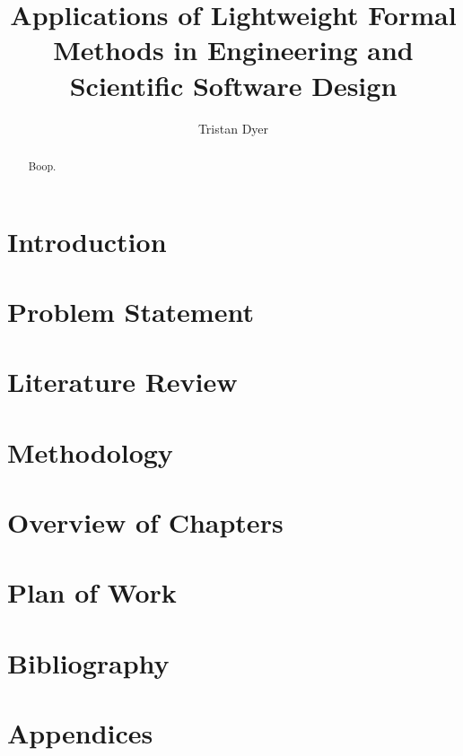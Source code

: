 \documentclass[draft, a4paper]{article}
\begin{document}
\title{Applications of Lightweight Formal Methods in Engineering and Scientific Software Design}
\author{Tristan Dyer}
\maketitle

\begin{abstract}
Boop.
\end{abstract}

\section{Introduction}


\section{Problem Statement}


\section{Literature Review}


\section{Methodology}


\section{Overview of Chapters}


\section{Plan of Work}


\section{Bibliography}


\section{Appendices}

\end{document}
